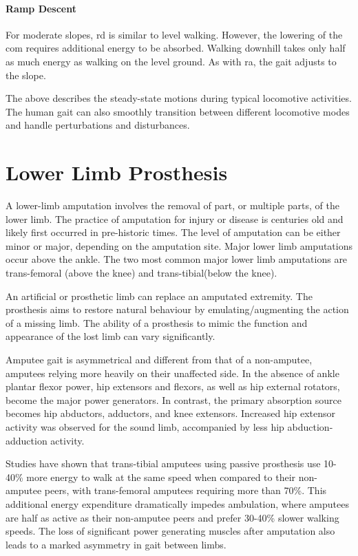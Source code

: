 \paragraph{Ramp Descent} For moderate slopes, \acrshort{rd} is similar to level walking. However, the lowering of the \acrshort{com} requires additional energy to be absorbed\cite{Franz2012a}. Walking downhill takes only half as much energy as walking on the level ground\cite{Matsumoto2017}. As with \acrshort{ra}, the gait adjusts to the slope.

The above describes the steady-state motions during typical locomotive activities. The human gait can also smoothly transition between different locomotive modes and handle perturbations and disturbances.\cite{Li2019}



\section{Lower Limb Prosthesis}
\label{sec:background-Prosthesis}
A lower-limb amputation involves the removal of part, or multiple parts, of the lower limb. The practice of amputation for injury or disease is centuries old and likely first occurred in pre-historic times\cite{Kirkup2007}. The level of amputation can be either minor or major, depending on the amputation site. Major lower limb amputations occur above the ankle. The two most common major lower limb amputations are trans-femoral (above the knee) and trans-tibial(below the knee).

An artificial or prosthetic limb can replace an amputated extremity. The prosthesis aims to restore natural behaviour by emulating/augmenting the action of a missing limb.\cite{Tucker2015} The ability of a prosthesis to mimic the function and appearance of the lost limb can vary significantly.

Amputee gait is asymmetrical and different from that of a non-amputee, amputees relying more heavily on their unaffected side.\cite{Bateni2002, Varrecchia2019} In the absence of ankle plantar flexor power, hip extensors and flexors, as well as hip external rotators, become the major power generators. In contrast, the primary absorption source becomes hip abductors, adductors, and knee extensors. Increased hip extensor activity was observed for the sound limb, accompanied by less hip abduction-adduction activity.\cite{Sadeghi2001}

Studies have shown that trans-tibial amputees using passive prosthesis use 10-40\% more energy to walk at the same speed when compared to their non-amputee peers\cite{McDonald2018, Herr2012}, with trans-femoral amputees requiring more than 70\%\cite{Stewart2008}. This additional energy expenditure dramatically impedes ambulation, where amputees are half as active as their non-amputee peers and prefer 30-40\% slower walking speeds\cite{Bussmann2008, Piazza2017, Lin2014, Au2009}. The loss of significant power generating muscles after amputation also leads to a marked asymmetry in gait between limbs\cite{Button2010}.

